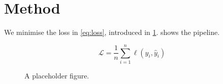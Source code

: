 \documentclass{article}
\begin{document}
\section{Method}\label{sec:method}
We minimise the loss in \cref{eq:loss}, introduced in \cref{sec:method}.
 shows the pipeline.

\begin{equation}\label{eq:loss}
  \mathcal{L} = \frac{1}{n} \sum_{i=1}^{n} \ell(y_i, \hat{y}_i)
\end{equation}

\begin{figure}[htbp]
  \centering
  \fbox{\rule{0pt}{1.2cm}\rule{5cm}{0pt}}
  \caption{A placeholder figure.}
  \label{fig:demo}
\end{figure}
\end{document}
